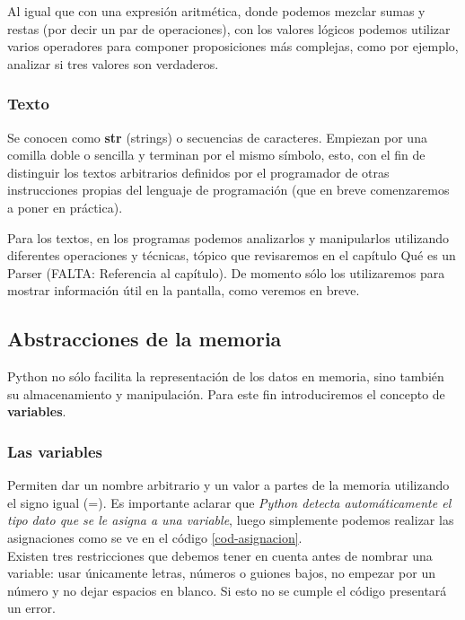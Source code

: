 Al igual que con una expresión aritmética, donde podemos mezclar sumas y restas (por decir un par de operaciones), con los valores lógicos podemos utilizar varios operadores para componer proposiciones más complejas, como por ejemplo, analizar si tres valores son verdaderos.

\subsubsection{Texto} 

Se conocen como \textbf{str} (strings) o secuencias de caracteres. Empiezan por una comilla doble o sencilla y terminan por el mismo símbolo, esto, con el fin de distinguir los textos arbitrarios definidos por el programador de otras instrucciones propias del lenguaje de programación (que en breve comenzaremos a poner en práctica).

Para los textos, en los programas podemos analizarlos y manipularlos utilizando diferentes operaciones y técnicas, tópico que revisaremos en el capítulo Qué es un Parser (FALTA: Referencia al capítulo). De momento sólo los utilizaremos para mostrar información útil en la pantalla, como veremos en breve.

\subsection{Abstracciones de la memoria}

Python no sólo facilita la representación de los datos en memoria, sino también su almacenamiento y manipulación. Para este fin introduciremos el concepto de \textbf{variables}.

\subsubsection{Las variables}

Permiten dar un nombre arbitrario y un valor a partes de la memoria utilizando el signo igual (=). Es importante aclarar que \emph{Python detecta automáticamente el tipo dato que se le asigna a una variable}, luego simplemente podemos realizar las asignaciones como se ve en el código \ref{cod-asignacion}. \\



Existen tres restricciones que debemos tener en cuenta antes de nombrar una variable: usar únicamente letras, números o guiones bajos, no empezar por un número y no dejar espacios en blanco. Si esto no se cumple el código presentará un error.

